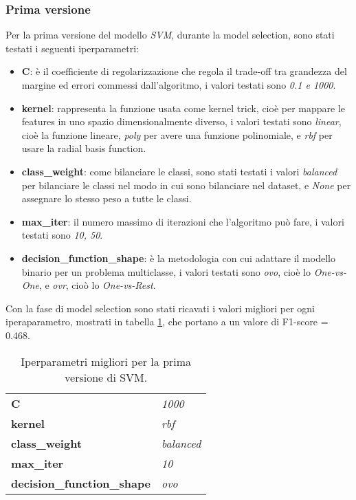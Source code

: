 \subsubsection{Prima versione}\label{subsubsec:svmv1}
Per la prima versione del modello \textit{SVM}, durante la model selection, sono stati testati i seguenti iperparametri:
\begin{itemize}
\item \textbf{C}: è il coefficiente di regolarizzazione che regola il trade-off tra grandezza del margine ed errori commessi dall'algoritmo, i valori testati sono \textit{0.1 e 1000}.
\item \textbf{kernel}: rappresenta la funzione usata come kernel trick, cioè per mappare le features in uno spazio dimensionalmente diverso, i valori testati sono \textit{linear}, cioè la funzione lineare, \textit{poly} per avere una funzione polinomiale, e \textit{rbf} per usare la radial basis function.
\item \textbf{class\_weight}: come bilanciare le classi, sono stati testati i valori \textit{balanced} per bilanciare le classi nel modo in cui sono bilanciare nel dataset, e \textit{None} per assegnare lo stesso peso a tutte le classi.
\item \textbf{max\_iter}: il numero massimo di iterazioni che l'algoritmo può fare, i valori testati sono \textit{10, 50}.
\item \textbf{decision\_function\_shape}: è la metodologia con cui adattare il modello binario per un problema multiclasse, i valori testati sono \textit{ovo}, cioè lo \textit{One-vs-One}, e \textit{ovr}, cioò lo \textit{One-vs-Rest}.
\end{itemize}

Con la fase di model selection sono stati ricavati i valori migliori per ogni iperaparametro, mostrati in tabella \ref{tab:svmv1}, che portano a un valore di F1-score = 0.468.

\begin{table}[h] 
\centering
\begin{tabular}{l l}
\hline
\textbf{C} & \textit{1000}\\
\textbf{kernel} & \textit{rbf}\\
\textbf{class\_weight} & \textit{balanced}\\
\textbf{max\_iter} & \textit{10}\\
\textbf{decision\_function\_shape} & \textit{ovo}\\
\hline
\end{tabular}
\caption{Iperparametri migliori per la prima versione di SVM.}
\label{tab:svmv1}
\end{table}

